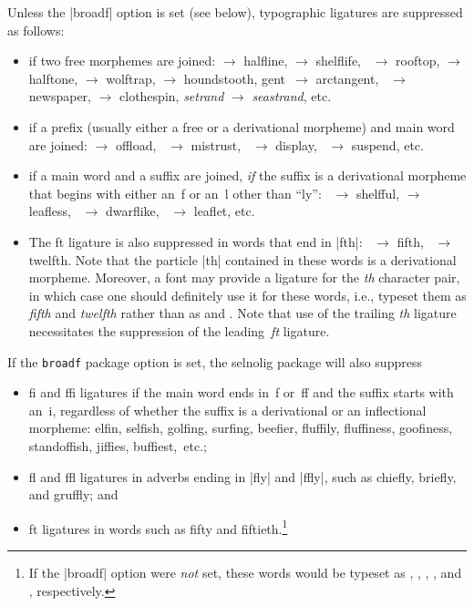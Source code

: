 \documentclass[11pt]{article}
\newcommand{\pkg}[1]{\textsf{#1}}
\newcommand{\opt}[1]{\texttt{#1}}
\begin{document}
Unless the |broadf| option is set (see below), typographic ligatures are suppressed as follows:
\begin{itemize}
\item if two free morphemes are joined:  $\to$ halfline,  $\to$ shelflife, ~$\to$ rooftop,  $\to$ halftone,  $\to$ wolftrap,  $\to$ houndstooth, \-gent~$\to$ arctangent, ~$\to$ newspaper,  $\to$ clothespin, \emph{setrand} $\to$ \emph{seastrand}, etc.

\item if a prefix (usually either a free or a derivational morpheme) and main word are joined:  $\to$ offload, ~$\to$ mistrust, ~$\to$ display, ~$\to$ suspend, etc. 

\item if a main word and a suffix are joined, \emph{if} the suffix is a derivational morpheme that begins with either an~f or an~l other than \enquote{ly}: ~$\to$ shelfful,  $\to$ leafless, ~$\to$ dwarflike, ~$\to$ leaflet, etc. 

\item The ft ligature is also suppressed in words that end in |fth|: ~$\to$ fifth, ~$\to$ twelfth. Note that the particle |th| contained in these words is a derivational morpheme. Moreover, a font may provide a ligature for the \emph{th} character pair, in which case one should definitely use it for these words, i.e., typeset them as \emph{fifth} and \emph{twelfth} rather than as \emph{} and \emph{}. Note that use of the trailing \emph{th} ligature necessitates the suppression of the leading\, \emph{ft} ligature.

\end{itemize}

If the \opt{broadf} package option is set, the \pkg{selnolig} package will also suppress
\begin{itemize}
\item fi and ffi ligatures if the main word ends in~f or~ff and the suffix starts with an~i, regardless of whether the suffix is a derivational or an inflectional morpheme: elfin, selfish, golfing, surfing, beefier, fluffily, fluffiness, goofiness, standoffish, jiffies, buffiest,~etc.;
\item fl and ffl ligatures in adverbs ending in |fly| and |ffly|, such as chiefly, briefly, and gruffly; and
\item ft ligatures in words such as fifty and fiftieth.\footnote{If the |broadf| option were \emph{not} set, these words would be typeset as , , , , and , respectively.}
\end{itemize}
\end{document}

